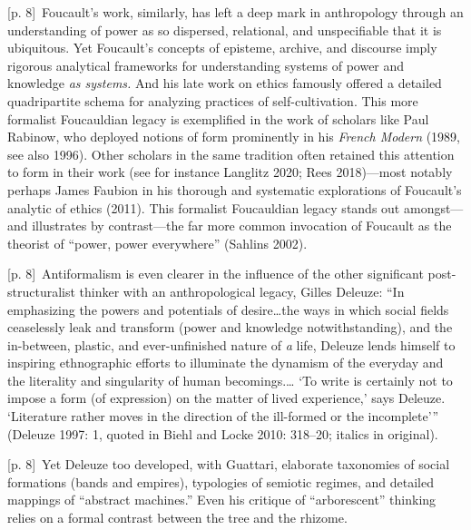 \documentclass[10pt,a4paper]{article}
\begin{document}
{\scriptsize\color{gray} [p. 8]}\ Foucault’s work, similarly, has left a deep mark in anthropology through an understanding of power as so dispersed, relational, and unspecifiable that it is ubiquitous. Yet Foucault’s concepts of episteme, archive, and discourse imply rigorous analytical frameworks for understanding systems of power and knowledge \textit{as systems.} And his late work on ethics famously offered a detailed quadripartite schema for analyzing practices of self-cultivation. This more formalist Foucauldian legacy is exemplified in the work of scholars like Paul Rabinow, who deployed notions of form prominently in his \textit{French Modern} (1989, see also 1996). Other scholars in the same tradition often retained this attention to form in their work (see for instance Langlitz 2020; Rees 2018)—most notably perhaps James Faubion in his thorough and systematic explorations of Foucault’s analytic of ethics (2011). This formalist Foucauldian legacy stands out amongst—and illustrates by contrast—the far more common invocation of Foucault as the theorist of “power, power everywhere” (Sahlins 2002).\par
{\scriptsize\color{gray} [p. 8]}\ Antiformalism is even clearer in the influence of the other significant post-structuralist thinker with an anthropological legacy, Gilles Deleuze: “In emphasizing the powers and potentials of desire…the ways in which social fields ceaselessly leak and transform (power and knowledge notwithstanding), and the in-between, plastic, and ever-unfinished nature of \textit{a} life, Deleuze lends himself to inspiring ethnographic efforts to illuminate the dynamism of the everyday and the literality and singularity of human becomings.… ‘To write is certainly not to impose a form (of expression) on the matter of lived experience,’ says Deleuze. ‘Literature rather moves in the direction of the ill-formed or the incomplete’” (Deleuze 1997: 1, quoted in Biehl and Locke 2010: 318–20; italics in original).\par
{\scriptsize\color{gray} [p. 8]}\ Yet Deleuze too developed, with Guattari, elaborate taxonomies of social formations (bands and empires), typologies of semiotic regimes, and detailed mappings of “abstract machines.” Even his critique of “arborescent” thinking relies on a formal contrast between the tree and the rhizome.\par
\end{document}
